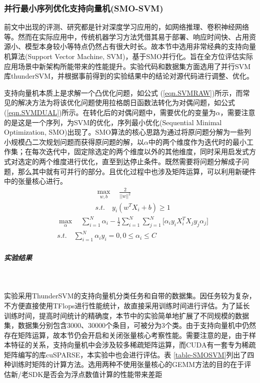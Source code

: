 \subsubsection{并行最小序列优化支持向量机(SMO-SVM)}
\par 前文中出现的评测、研究都是针对深度学习应用的，如网络推理、卷积神经网络等。然而在实际应用中，传统机器学习方法凭借其易于部署、响应时间快、占用资源小、模型本身较小等特点仍然占有很大时长。故本节中选用非常经典的支持向量机算法(Support Vector Machine, SVM)，基于SMO并行化。旨在全方位评估实际应用场景中新架构所能带来的性能提升。实验代码和数据集方面选用了并行SVM库thunderSVM，并根据事前得到的实验结果中的结论对源代码进行调整、优化。
\par 支持向量机本质上是求解一个凸优化问题，如公式 (\ref{eqn.SVMRAW})所示，而常见的解决方法为将该优化问题使用拉格朗日函数法转化为对偶问题，如公式 (\ref{eqn.SVMDUAL})所示。在转化后的对偶问题中，需要优化的变量为$ \alpha $，需要注意的是这是一个序列，为SVM的优化，序列最小优化(Sequential Minimal Optimization, SMO)出现了\cite{SMO}。SMO算法的核心思路为通过将原问题分解为一些列小规模凸二次规划问题而获得原问题的解，以$ \alpha $中的两个维度作为迭代时的最小工作集；在每次迭代中，固定除选定的两个维度以外的其他维度，同时采用启发式方式对选定的两个维度进行优化，直至到达停止条件。既然需要将问题分解成子问题，那么其中就有可并行的部分。且优化过程中也涉及矩阵运算，可以利用新硬件中的张量核心进行。
\begin{equation}
\begin{aligned}
&\max_{w, b} \quad \frac{2}{||w||^2} \\
&s.t.\quad y_{i}(w^{T}X_{i}+b) \geq 1
\end{aligned}
\label{eqn.SVMRAW}
\end{equation}
\begin{equation}
\begin{aligned}
&\max_{\alpha} \quad \sum_{i=1}^{N}\alpha_{i} - \frac{1}{2}\sum_{i=1}^{N}\sum_{j=1}^{N}\lbrack \alpha_{i}y_{i}X_{i}^{T}X_{j}y_{j}\alpha_{j} \rbrack \\
&s.t.\quad \sum_{i=1}^{N}\alpha_{i}y_{i}=0, 0 \leq \alpha_{i} \leq C
\end{aligned}
\label{eqn.SVMDUAL}
\end{equation}
\subparagraph{实验结果}~{}
\par 实验采用ThunderSVM的支持向量机分类任务和自带的数据集。因任务较为复杂，不方便直接使用TFlops进行性能统计，故直接采用训练时间进行评估。为了延长训练时间，提高时间统计的精确度，本节中的实验简单地扩展了不同规模的数据集，数据集分别包含3000、30000个条目，可被分为3个类。由于支持向量机中仍然存在矩阵运算，故本节仍会开启和关闭张量核心考察性能。需要注意的是，由于样本特征的关系，支持向量机中会涉及较多稀疏矩阵运算，而CUDA有一套专为稀疏矩阵编写的库cuSPARSE，本实验中也会进行评估。表 \ref{table-SMOSVM}列出了四种训练时矩阵的计算方法。选用两种不使用张量核心的GEMM方法的目的在于评估新/老SDK是否会为浮点数值计算的性能带来差距
